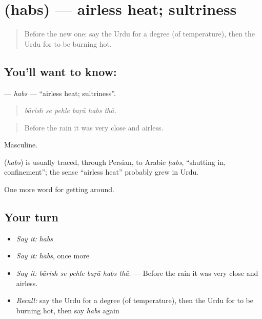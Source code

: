 \section[\texorpdfstring{\ur{حبس} (habs)}{حبس (habs)}]{ (habs) — airless heat; sultriness}

\label{lesson:UR-C430-habs}



\begin{quote}
Before the new one: say the Urdu for a degree (of temperature), then the Urdu for to be burning hot.
\end{quote}

\subsection*{You'll want to know: }
\textbf{} — \emph{habs} — \textquotedblleft{}airless heat; sultriness\textquotedblright{}.

\begin{quote}
     
\end{quote}

\begin{quote}
\emph{bārish se pehle baṛā habs thā.}
\end{quote}

\begin{quote}
Before the rain it was very close and airless.
\end{quote}

Masculine.

\begin{cousinweb}
\textbf{} (\emph{habs}) is usually traced, through Persian, to Arabic \emph{ḥabs}, \textquotedblleft{}shutting in, confinement\textquotedblright{}; the sense \textquotedblleft{}airless heat\textquotedblright{} probably grew in Urdu.
\end{cousinweb}

\begin{grammarlens}[title={What you've built}]
One more word for getting around.
\end{grammarlens}

\subsection*{Your turn}
\begin{itemize}
\raggedright
  \item \emph{Say it:} \emph{habs}
  \item \emph{Say it:} \emph{habs}, once more
  \item \emph{Say it:} \emph{bārish se pehle baṛā habs thā.} — Before the rain it was very close and airless.
  \item \emph{Recall:} say the Urdu for a degree (of temperature), then the Urdu for to be burning hot, then say \emph{habs} again
\end{itemize}

